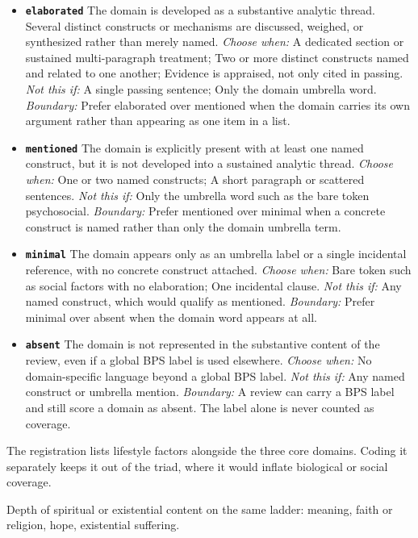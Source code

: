 \documentclass[11pt]{article}
\begin{document}
\begin{description}
  \begin{itemize}[leftmargin=1.3em,itemsep=2pt,topsep=2pt]
  \item \textbf{\texttt{elaborated}} The domain is developed as a substantive analytic thread. Several distinct constructs or mechanisms are discussed, weighed, or synthesized rather than merely named. {\small \textit{Choose when:} A dedicated section or sustained multi-paragraph treatment; Two or more distinct constructs named and related to one another; Evidence is appraised, not only cited in passing. \textit{Not this if:} A single passing sentence; Only the domain umbrella word. \textit{Boundary:} Prefer elaborated over mentioned when the domain carries its own argument rather than appearing as one item in a list.}
  \item \textbf{\texttt{mentioned}} The domain is explicitly present with at least one named construct, but it is not developed into a sustained analytic thread. {\small \textit{Choose when:} One or two named constructs; A short paragraph or scattered sentences. \textit{Not this if:} Only the umbrella word such as the bare token psychosocial. \textit{Boundary:} Prefer mentioned over minimal when a concrete construct is named rather than only the domain umbrella term.}
  \item \textbf{\texttt{minimal}} The domain appears only as an umbrella label or a single incidental reference, with no concrete construct attached. {\small \textit{Choose when:} Bare token such as social factors with no elaboration; One incidental clause. \textit{Not this if:} Any named construct, which would qualify as mentioned. \textit{Boundary:} Prefer minimal over absent when the domain word appears at all.}
  \item \textbf{\texttt{absent}} The domain is not represented in the substantive content of the review, even if a global BPS label is used elsewhere. {\small \textit{Choose when:} No domain-specific language beyond a global BPS label. \textit{Not this if:} Any named construct or umbrella mention. \textit{Boundary:} A review can carry a BPS label and still score a domain as absent. The label alone is never counted as coverage.}
  \end{itemize}
{\small The registration lists lifestyle factors alongside the three core domains. Coding it separately keeps it out of the triad, where it would inflate biological or social coverage.}
\item[\texttt{coverage\_spiritual\_existential}] Depth of spiritual or existential content on the same ladder: meaning, faith or religion, hope, existential suffering.

\end{description}
\end{document}
